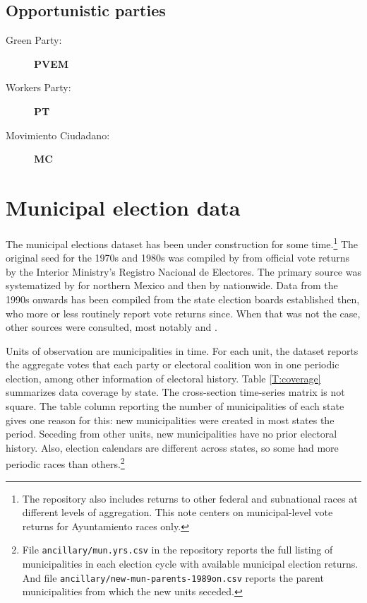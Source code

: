 \documentclass[letter,12pt]{article}
\begin{document}
\subsection{Opportunistic parties}

\begin{description}
\item[Green Party:] \textbf{PVEM}
\item[Workers Party:] \textbf{PT}   
\item[Movimiento Ciudadano:] \textbf{MC}  
\end{description}

\section{Municipal election data}
The municipal elections dataset has been under construction for some time.\footnote{The repository also includes returns to other federal and subnational races at different levels of aggregation. This note centers on municipal-level vote returns for Ayuntamiento races only.} The original seed for the 1970s and 1980s was compiled by \citet{molinar.1991a} from official vote returns by the Interior Ministry's Registro Nacional de Electores. The primary source was systematized by \citet{magar.1994} for northern Mexico and then by \citet{varela.2004} nationwide. Data from the 1990s onwards has been compiled from the state election boards established then, who more or less routinely report vote returns since. When that was not the case, other sources were consulted, most notably \citet{revista.voz.y.voto} and \citet{cede.uam.izt}.

Units of observation are municipalities in time. For each unit, the dataset reports the aggregate votes that each party or electoral coalition won in one periodic election, among other information of electoral history. Table \ref{T:coverage} summarizes data coverage by state. The cross-section time-series matrix is not square. The table column reporting the number of municipalities of each state gives one reason for this: new municipalities were created in most states the period. Seceding from other units, new municipalities have no prior electoral history. Also, election calendars are different across states, so some had more periodic races than others.\footnote{File \verb|ancillary/mun.yrs.csv| in the repository reports the full listing of municipalities in each election cycle with available municipal election returns. And file \verb|ancillary/new-mun-parents-1989on.csv| reports the parent municipalities from which the new units seceded.}
\end{document}
